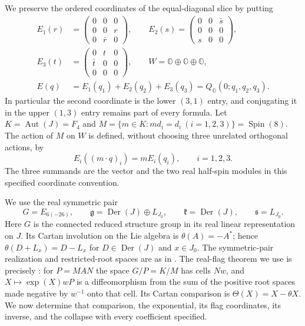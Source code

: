 \documentclass[11pt]{article}
\theoremstyle{definition}
\begin{document}
We preserve the ordered coordinates of the equal-diagonal slice by putting
\begin{equation}
 \begin{aligned}
 E_1(r)&=\begin{pmatrix}0&0&0\\0&0&r\\0&\bar r&0\end{pmatrix},\qquad
 E_2(s)=\begin{pmatrix}0&0&\bar s\\0&0&0\\s&0&0\end{pmatrix},\\
 E_3(t)&=\begin{pmatrix}0&t&0\\\bar t&0&0\\0&0&0\end{pmatrix},\qquad
 W=\mathbb O\oplus\mathbb O\oplus\mathbb O,\\
 E(q)&=E_1(q_1)+E_2(q_2)+E_3(q_3)
      =Q_{\mathbb O}(0;q_1,q_2,q_3).
 \end{aligned}
 \label{fc:coordinate-operators}
\end{equation}
In particular the second coordinate is the lower $(3,1)$ entry, and
conjugating it in the upper $(1,3)$ entry remains part of every formula.
Let $K=\operatorname{Aut}(J)=F_4$ and
$M=\{m\in K:m d_i=d_i\ (i=1,2,3)\}=\operatorname{Spin}(8)$.
The action of $M$ on $W$ is defined, without choosing three unrelated
orthogonal actions, by
\begin{equation}
 E_i((m\cdot q)_i)=mE_i(q_i),\qquad i=1,2,3.
 \label{fc:triality-action}
\end{equation}
The three summands are the vector and the two real half-spin modules in
this specified coordinate convention.

We use the real symmetric pair
\[
 G=E_{6(-26)},\qquad
 \mathfrak g=\operatorname{Der}(J)\oplus L_{J_0},\qquad
 \mathfrak k=\operatorname{Der}(J),\qquad
 \mathfrak s=L_{J_0}.
\]
Here $G$ is the connected reduced structure group in its real linear
representation on $J$. Its Cartan involution on the Lie algebra is
$\theta(A)=-A^*$; hence
$\theta(D+L_x)=D-L_x$ for $D\in\operatorname{Der}(J)$ and $x\in J_0$.
The symmetric-pair realization and restricted-root spaces are as in
\cite[Section~2.6, pp.~491--493]{MareWillems2013}.
The real-flag theorem we use is precisely
\cite[Appendix~B, Theorem~B.2, Proposition~B.3 and Corollary~B.4,
p.~519]{MareWillems2013}: for $P=MAN$ the space $G/P=K/M$
has cells $Nw$, and $X\mapsto\exp(X)wP$ is a diffeomorphism from
the sum of the positive root spaces made negative by $w^{-1}$ onto
that cell. Its Cartan comparison is $\Theta(X)=X-\theta X$.
We now determine that comparison, the exponential, its flag coordinates,
its inverse, and the collapse with every coefficient specified.
\end{document}
